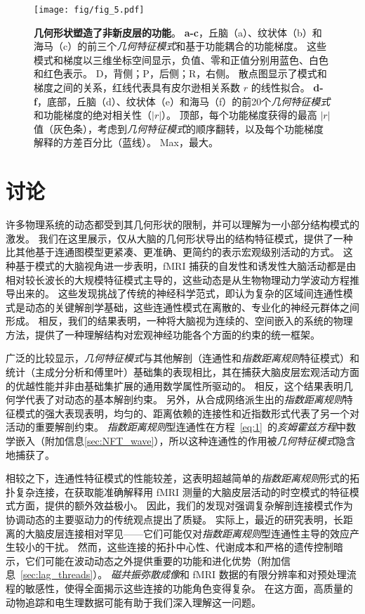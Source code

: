 \documentclass[lang=cn,a4paper,newtx]{elegantpaper}
\begin{document}
\begin{figure}[!htb]
	\centering
	\texttt{[image: fig/fig\_5.pdf]}
	\caption{\textbf{几何形状塑造了非新皮层的功能}。
		\textbf{a-c}，丘脑（a）、纹状体（b）和海马（c）的前三个\textit{几何特征模式}和基于功能耦合的功能梯度。
		这些模式和梯度以三维坐标空间显示，负值、零和正值分别用蓝色、白色和红色表示。
		D，背侧；P，后侧；R，右侧。
		散点图显示了模式和梯度之间的关系，红线代表具有皮尔逊相关系数 $ r $ 的线性拟合。
		\textbf{d-f}，底部，丘脑（d）、纹状体（e）和海马（f）的前20个\textit{几何特征模式}和功能梯度的绝对相关性（$ |r| $）。
		顶部，每个功能梯度获得的最高 $ |r| $ 值（灰色条），考虑到\textit{几何特征模式}的顺序翻转，以及每个功能梯度解释的方差百分比（蓝线）。
		Max，最大。
	} \label{fig:5}
\end{figure}



\section{讨论}

许多物理系统的动态都受到其几何形状的限制，并可以理解为一小部分结构模式的激发。
我们在这里展示，仅从大脑的几何形状导出的结构特征模式，提供了一种比其他基于连通图模型更紧凑、更准确、更简约的表示宏观级别活动的方式。
这种基于模式的大脑视角进一步表明，fMRI 捕获的自发性和诱发性大脑活动都是由相对较长波长的大规模特征模式主导的，这些动态是从生物物理动力学波动方程推导出来的。
这些发现挑战了传统的神经科学范式，即认为复杂的区域间连通性模式是动态的关键解剖学基础，这些连通性模式在离散的、专业化的神经元群体之间形成。
相反，我们的结果表明，一种将大脑视为连续的、空间嵌入的系统的物理方法，提供了一种理解结构对宏观神经功能各个方面的约束的统一框架。


广泛的比较显示，\textit{几何特征模式}与其他解剖（连通性和\textit{指数距离规则}特征模式）和统计（主成分分析和傅里叶）基础集的表现相比，其在捕获大脑皮层宏观活动方面的优越性能并非由基础集扩展的通用数学属性所驱动的。
相反，这个结果表明几何学代表了对动态的基本解剖约束。
另外，从合成网络派生出的\textit{指数距离规则}特征模式的强大表现表明，均匀的、距离依赖的连接性和近指数形式代表了另一个对活动的重要解剖约束。
\textit{指数距离规则}型连通性在方程~\ref{eq:1}~的\textit{亥姆霍兹方程}中数学嵌入（附加信息\ref{sec:NFT_wave}），所以这种连通性的作用被\textit{几何特征模式}隐含地捕获了。


相较之下，连通性特征模式的性能较差，这表明超越简单的\textit{指数距离规则}形式的拓扑复杂连接，在获取能准确解释用 fMRI 测量的大脑皮层活动的时空模式的特征模式方面，提供的额外效益极小。
因此，我们的发现对强调复杂解剖连接模式作为协调动态的主要驱动力的传统观点提出了质疑。
实际上，最近的研究表明，长距离的大脑皮层连接相对罕见——它们可能仅对\textit{指数距离规则}型连通性主导的效应产生较小的干扰。
然而，这些连接的拓扑中心性、代谢成本和严格的遗传控制暗示，它们可能在波动动态之外提供重要的功能和进化优势（附加信息~\ref{sec:lag_threads}）。
\textit{磁共振弥散成像}和 fMRI 数据的有限分辨率和对预处理流程的敏感性，使得全面揭示这些连接的功能角色变得复杂。
在这方面，高质量的动物追踪和电生理数据可能有助于我们深入理解这一问题。
\end{document}
